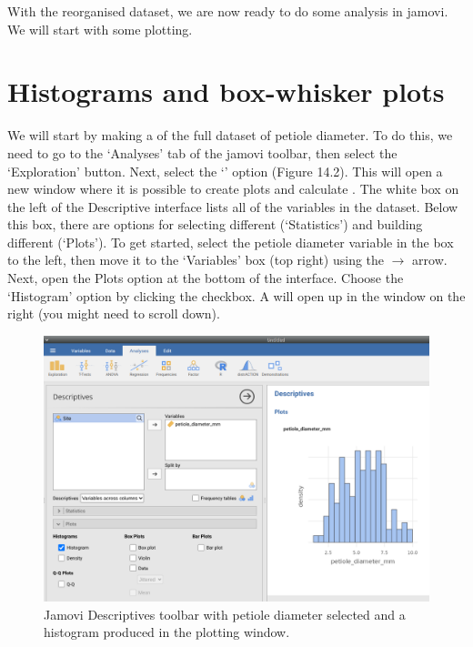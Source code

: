 \documentclass[
  openany]{krantz}
\begin{document}
With the reorganised dataset, we are now ready to do some analysis in jamovi.
We will start with some plotting.

\hypertarget{histograms-and-box-whisker-plots}{%
\section{Histograms and box-whisker plots}\label{histograms-and-box-whisker-plots}}

We will start by making a  of the full dataset of petiole diameter.
To do this, we need to go to the `Analyses' tab of the jamovi toolbar, then select the `Exploration' button.
Next, select the `' option (Figure 14.2).
This will open a new window where it is possible to create plots and calculate .
The white box on the left of the Descriptive interface lists all of the variables in the dataset.
Below this box, there are options for selecting different  (`Statistics') and building different  (`Plots').
To get started, select the petiole diameter variable in the box to the left, then move it to the `Variables' box (top right) using the \(\to\) arrow.
Next, open the Plots option at the bottom of the interface.
Choose the `Histogram' option by clicking the checkbox.
A  will open up in the window on the right (you might need to scroll down).

\begin{figure}
\includegraphics[width=1\linewidth]{img/lilypad_histogram} \caption{Jamovi Descriptives toolbar with petiole diameter selected and a histogram produced in the plotting window.}\label{fig:unnamed-chunk-48}
\end{figure}
\end{document}
